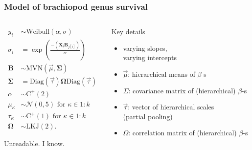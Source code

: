 \documentclass{beamer}
\begin{document}
\begin{frame}
  \frametitle{Model of brachiopod genus survival}
 
  \begin{columns}
    \begin{column}{0.5\textwidth}
      \begin{align*}
        y_{i} &\sim \mathrm{Weibull}(\alpha, \sigma) \\
        \sigma_{i} &= \exp\left(\frac{-(\mathbf{X}_{i} \mathbf{B}_{j[i]})}{\alpha}\right) \\
        \mathbf{B} &\sim \mathrm{MVN}(\vec{\mu}, \mathbf{\Sigma}) \\
        \mathbf{\Sigma} &= \text{Diag}(\vec{\tau}) \mathbf{\Omega} \text{Diag}(\vec{\tau}) \\
        \alpha &\sim \mathrm{C^{+}}(2) \\
        \mu_{\kappa} &\sim \mathcal{N}(0, 5) \text{ for } \kappa \in 1:k \\
        \tau_{\kappa} &\sim \mathrm{C^{+}}(1) \text{ for } \kappa \in 1:k \\
        \mathbf{\Omega} &\sim \text{LKJ}(2).
      \end{align*}

      \bigskip

      \footnotesize{Unreadable. I know.}
    \end{column}
    \begin{column}{0.5\textwidth}
      Key details
      \begin{itemize}
        \item varying slopes, \\varying intercepts
        \item \(\vec{\mu}\): hierarchical means of \(\beta\)-s
        \item \(\Sigma\): covariance matrix of (hierarchical) \(\beta\)-s
        \item \(\vec{\tau}\): vector of hierarchical scales \\(partial pooling)
        \item \(\Omega\): correlation matrix of (hierarchical) \(\beta\)-s
      \end{itemize}

    \end{column}
  \end{columns}
\end{frame}
\end{document}
